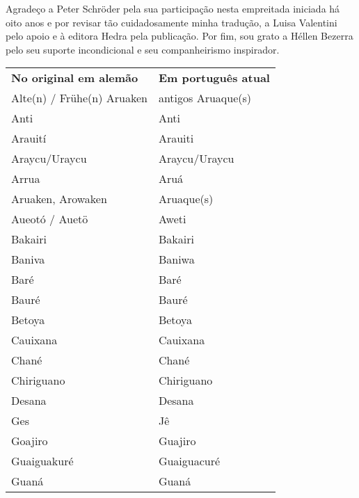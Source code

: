 Agradeço a Peter Schröder pela sua participação nesta empreitada
iniciada há oito anos e por revisar tão cuidadosamente minha tradução, a
Luisa Valentini pelo apoio e à editora Hedra pela publicação. Por fim,
sou grato a Héllen Bezerra pelo seu suporte incondicional e seu
companheirismo inspirador.

\begin{table}[ht!]
\begin{center}
\begin{tabular}{ll}
\textbf{No original em alemão} & \textbf{Em português atual} \\
Alte(n) / Frühe(n) Aruaken     & antigos Aruaque(s)          \\
Anti                           & Anti       				\\                
Arauití & Arauiti \\ 
Araycu/Uraycu & Araycu/Uraycu \\ 
Arrua & Aruá \\ 
Aruaken, Arowaken & Aruaque(s) \\ 
Aueotó / Auetö & Aweti \\ 
Bakairi & Bakairi \\ 
Baniva & Baniwa \\ 
Baré & Baré \\ 
Bauré & Bauré \\ 
Betoya & Betoya \\ 
Cauixana & Cauixana \\ 
Chané & Chané \\ 
Chiriguano & Chiriguano \\ 
Desana & Desana \\ 
Ges & Jê \\ 
Goajiro & Guajiro \\ 
Guaiguakuré & Guaiguacuré \\ 
Guaná & Guaná \\ 
\end{tabular}
\end{center}
\end{table}


